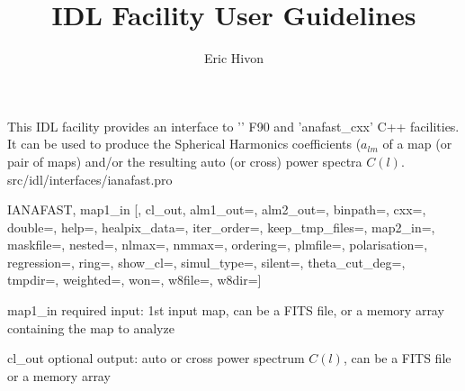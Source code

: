 
\sloppy

\title{\healpix IDL Facility User Guidelines}
 \section[ianafast]{ }
\label{idl:ianafast}
\author{Eric Hivon}

\begin{facility}
{This IDL facility provides an interface to '' F90 and 'anafast\_cxx' C++
facilities. It can be used to produce the Spherical Harmonics coefficients
($a_{lm}$ of a \healpix map (or pair of maps) and/or the resulting auto (or
cross) power spectra $C(l)$.}
{src/idl/interfaces/ianafast.pro}
\end{facility}

\begin{IDLformat}
{IANAFAST,  map1\_in [, cl\_out,
       alm1\_out=, alm2\_out=, binpath=, cxx=, double=, help=, healpix\_data=, iter\_order=, keep\_tmp\_files=, 
       map2\_in=, maskfile=, nested=, nlmax=, nmmax=, ordering=, plmfile=, polarisation=, 
       regression=, ring=, show\_cl=, simul\_type=, silent=, theta\_cut\_deg=, tmpdir=, 
       weighted=, won=, w8file=, w8dir=]}
\end{IDLformat}

\begin{qualifiers}
  \begin{qulist}{} %
   \item[map1\_in] required input: 1st input map, can be a FITS file, or a memory array containing the
        map to analyze
    \item[cl\_out] optional output: auto or cross power spectrum $C(l)$, can be a FITS
file or a memory array
  \end{qulist}
\end{qualifiers}

